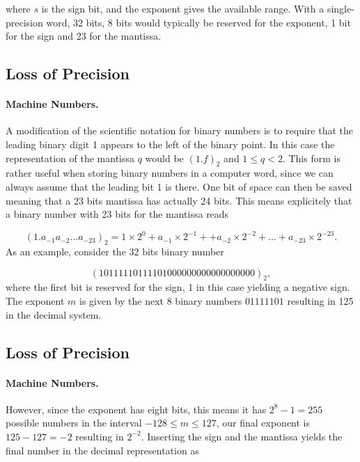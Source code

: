 \documentclass[%
oneside,                 %
final,                   %
10pt]{article}
\begin{document}
{{{{{where $s$ is the sign bit, and the exponent gives the available range.
With a single-precision word, 32 bits, 8 bits would typically be reserved
for the exponent,  1 bit for the sign and 23 for the mantissa.



\subsection{Loss of Precision}


\paragraph{Machine Numbers.}
A modification of the scientific notation for binary numbers is to
require that the leading binary digit 1 appears to the left of the binary point.
In this case the representation of the mantissa $q$ would be
$(1.f)_2$ and $ 1 \le q < 2$. This form is rather useful when storing
binary numbers in a computer word, since we can always assume that the leading
bit 1 is there. One bit of space can then be saved meaning that a 23 bits
mantissa has actually 24 bits. This means explicitely that a binary number with 23 bits
for the mantissa reads

\begin{equation}
(1.a_{-1}a_{-2}\dots a_{-23})_2=1\times 2^0+a_{-1}\times 2^{-1}+
+a_{-2}\times 2^{-2}+\dots+a_{-23}\times 2^{-23}.
\end{equation}
As an example, consider the 32 bits binary number

\[
(10111110111101000000000000000000)_2,
\]
where the first bit is reserved for the sign, 1 in this case yielding a
negative sign. The exponent $m$ is given by the next 8 binary numbers
$01111101$ resulting in 125 in the decimal system.



\subsection{Loss of Precision}


\paragraph{Machine Numbers.}
However, since the
exponent has eight bits, this means it has  $2^8-1=255$ possible numbers in the interval
$-128 \le m \le 127$, our final
exponent is $125-127=-2$ resulting in $2^{-2}$.
Inserting the sign and the mantissa yields the final number in the decimal representation as

}}}}}
\end{document}
